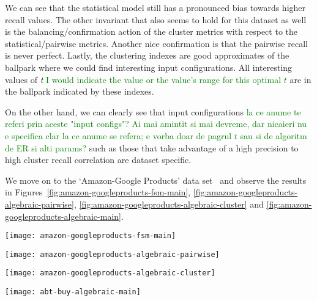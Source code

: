 We can see that the statistical model still has a pronounced bias towards higher
recall values.
The other invariant that also seems to hold for this dataset as well is the
balancing/confirmation action of the cluster metrics with respect to the
statistical/pairwise metrics.
Another nice confirmation is that the pairwise recall is never perfect.
Lastly, the clustering indexes are good approximates of the ballpark where
we could find  interesting input configurations.
All interesting values of \textit{t} 
\textcolor{green}{I would indicate the value or the value's range for this optimal $t$} 
are in the ballpark indicated by these
indexes.

On the other hand, we can clearly see that input configurations 
\textcolor{green}{la ce anume te referi prin aceste "input configs"? Ai mai amintit si mai devreme, dar nicaieri nu e specifica clar la ce anume se refera; e vorba doar de pagrul $t$ sau si de algoritm de ER si alti params?}  
such as those
that take advantage of a high precision to high cluster recall correlation are
dataset specific.

We move on to the `Amazon-Google Products' data set~\cite{vldb2010} and observe
the results in Figures~\ref{fig:amazon-googleproducts-fsm-main},
\ref{fig:amazon-googleproducts-algebraic-pairwise},
\ref{fig:amazon-googleproducts-algebraic-cluster} and
\ref{fig:amazon-googleproducts-algebraic-main}.

\begin{figure*}[h]
    \begin{minipage}{0.24\textwidth}
        \centering
        \texttt{[image: amazon-googleproducts-fsm-main]}
        \caption{Amazon-Google statistical metrics.}
        \label{fig:amazon-googleproducts-fsm-main}
    \end{minipage}
    \begin{minipage}{0.24\textwidth}
        \centering
        \texttt{[image: amazon-googleproducts-algebraic-pairwise]}
        \caption{Amazon-Google pairwise metrics.}
        \label{fig:amazon-googleproducts-algebraic-pairwise}
    \end{minipage}
    \begin{minipage}{0.24\textwidth}
        \centering
        \texttt{[image: amazon-googleproducts-algebraic-cluster]}
        \caption{Amazon-Google cluster metrics.}
        \label{fig:amazon-googleproducts-algebraic-cluster}
    \end{minipage}
    \begin{minipage}{0.24\textwidth}
        \centering
        \texttt{[image: abt-buy-algebraic-main]}
        \caption{Amazon-Google clustering indexes.}
        \label{fig:amazon-googleproducts-algebraic-main}
    \end{minipage}
\end{figure*}\label{amazon-google}

